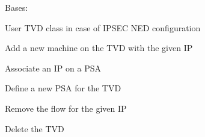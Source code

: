 \documentclass[letterpaper,10pt,oneside]{sphinxmanual}
\begin{document}
\begin{fulllineitems}
\label{userTVDIPSECLess:userTVDIPSECLess.UserTVD}
Bases: 

User TVD class in case of IPSEC NED configuration

\begin{fulllineitems}
\label{userTVDIPSECLess:userTVDIPSECLess.UserTVD.addNewIP}
Add a new machine on the TVD with the given IP

\end{fulllineitems}


\begin{fulllineitems}
\label{userTVDIPSECLess:userTVDIPSECLess.UserTVD.associateIPPSA}
Associate an IP on a PSA

\end{fulllineitems}


\begin{fulllineitems}
\label{userTVDIPSECLess:userTVDIPSECLess.UserTVD.definePSA}
Define a new PSA for the TVD

\end{fulllineitems}


\begin{fulllineitems}
\label{userTVDIPSECLess:userTVDIPSECLess.UserTVD.delUserIP}
Remove the flow for the given IP

\end{fulllineitems}


\begin{fulllineitems}
\label{userTVDIPSECLess:userTVDIPSECLess.UserTVD.deleteAllTVD}
Delete the TVD


\end{fulllineitems}
\end{fulllineitems}
\end{document}
